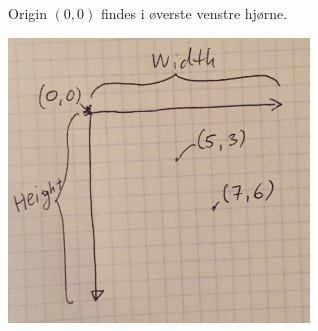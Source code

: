 \documentclass[rgb]{beamer}
\begin{document}
\begin{frame}[fragile]
\begin{footnotesize}


  \vspace{1ex}

  Origin $(0,0)$ findes i øverste venstre hjørne.
  \vspace{1ex}

  \includegraphics[width=0.6\textwidth]{../images/bitmap_coordinates.jpg}

\end{footnotesize}
\end{frame}
\end{document}
